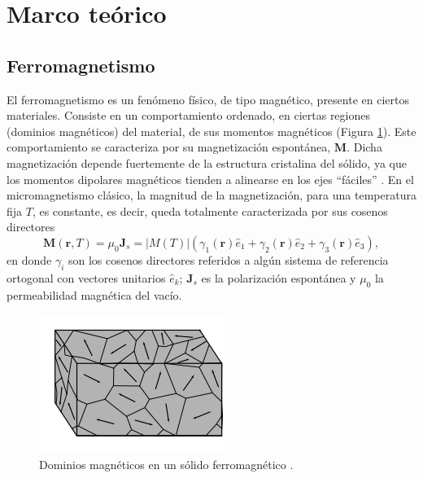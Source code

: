 \newpage
\section{Marco teórico}
\subsection{Ferromagnetismo}


El ferromagnetismo es un fenómeno físico, de tipo magnético, presente en ciertos materiales. Consiste en un comportamiento ordenado, en ciertas regiones (dominios magnéticos) del material, de sus momentos magnéticos (Figura \ref{fig:MagneticDomain}). Este comportamiento se caracteriza por su magnetización espontánea, $\bm{M}$. Dicha magnetización depende fuertemente de la estructura cristalina del sólido, ya que los momentos dipolares magnéticos tienden a alinearse en los ejes  ``fáciles'' \cite{coey_2010}. En el micromagnetismo clásico, la magnitud de la magnetización, para una temperatura fija $T$, es constante, es decir, queda totalmente caracterizada por sus cosenos directores \cite{Exl2020} \[ \bm{M} (\bm{r},T) = \mu_0 \bm{J}_s = |M (T)| (\gamma_1 (\bm{r}) \hat{e}_1 + \gamma_2 (\bm{r}) \hat{e}_2 + \gamma_3 (\bm{r}) \hat{e}_3 ), \] en donde $\gamma_i$ son los cosenos directores referidos a algún sistema de referencia ortogonal con vectores unitarios $\hat{e}_k$; $\bm{J}_s$ es la polarización espontánea y $\mu_0$ la permeabilidad magnética del vacío.
\begin{figure}[!htp]
    \centering
    \includegraphics{Figuras/MagneticDomain.png}
    \renewcommand{\figurename}{\textbf{Figura}}
    \renewcommand\thefigure{\textbf{\arabic{figure}}}
    \caption{Dominios magnéticos en un sólido ferromagnético \cite{coey_2010}.}
    \label{fig:MagneticDomain}
\end{figure}
